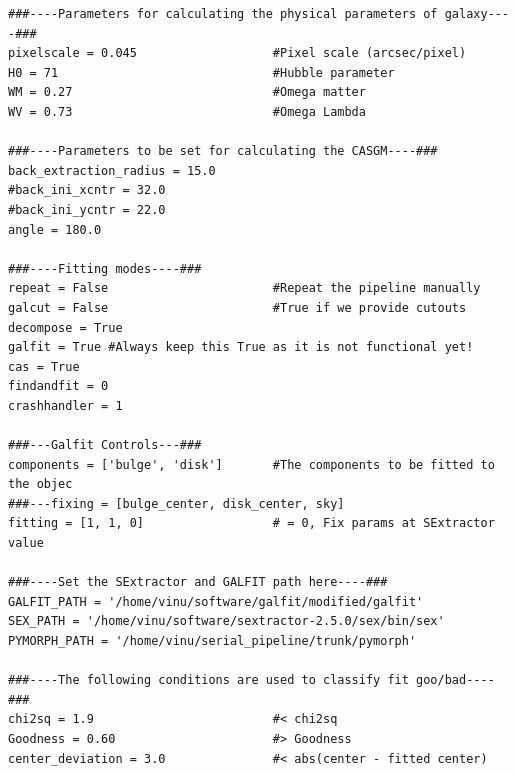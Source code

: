 \documentclass[a4paper,12pt]{article}
\begin{document}
\begin{footnotesize}
\begin{verbatim}
###----Parameters for calculating the physical parameters of galaxy----###
pixelscale = 0.045                   #Pixel scale (arcsec/pixel)
H0 = 71                              #Hubble parameter
WM = 0.27                            #Omega matter
WV = 0.73                            #Omega Lambda

###----Parameters to be set for calculating the CASGM----###
back_extraction_radius = 15.0
#back_ini_xcntr = 32.0 
#back_ini_ycntr = 22.0
angle = 180.0

###----Fitting modes----###
repeat = False                       #Repeat the pipeline manually
galcut = False                       #True if we provide cutouts
decompose = True
galfit = True #Always keep this True as it is not functional yet!
cas = True
findandfit = 0
crashhandler = 1

###---Galfit Controls---###
components = ['bulge', 'disk']       #The components to be fitted to the objec
###---fixing = [bulge_center, disk_center, sky]
fitting = [1, 1, 0]                  # = 0, Fix params at SExtractor value

###----Set the SExtractor and GALFIT path here----###
GALFIT_PATH = '/home/vinu/software/galfit/modified/galfit' 
SEX_PATH = '/home/vinu/software/sextractor-2.5.0/sex/bin/sex'
PYMORPH_PATH = '/home/vinu/serial_pipeline/trunk/pymorph'

###----The following conditions are used to classify fit goo/bad----###
chi2sq = 1.9                         #< chi2sq
Goodness = 0.60                      #> Goodness
center_deviation = 3.0               #< abs(center - fitted center)
\end{verbatim}
\end{footnotesize}
\end{document}
